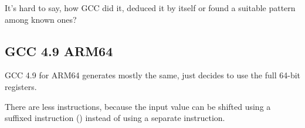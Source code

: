 It's hard to say, how GCC did it, deduced it by itself or found a suitable pattern among known ones?

\subsection{\Optimizing GCC 4.9 ARM64}

GCC 4.9 for ARM64 generates mostly the same, just decides to use the full 64-bit registers.

There are less instructions, because the input value can be shifted using a suffixed instruction ()
instead of using a separate instruction.


